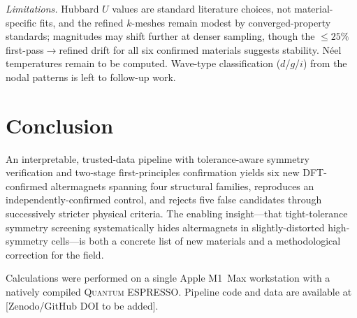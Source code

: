 \documentclass[aps,prmaterials,twocolumn,superscriptaddress,showkeys]{revtex4-2}
\begin{document}
\textit{Limitations.} Hubbard $U$ values are standard literature choices, not
material-specific fits, and the refined $k$-meshes remain modest by
converged-property standards; magnitudes may shift further at denser sampling,
though the $\leq 25\%$ first-pass$\to$refined drift for all six confirmed
materials suggests stability. N\'eel temperatures remain to be computed.
Wave-type classification ($d$/$g$/$i$) from the nodal patterns is left to
follow-up work.

\section{Conclusion}

An interpretable, trusted-data pipeline with tolerance-aware symmetry
verification and two-stage first-principles confirmation yields six new
DFT-confirmed altermagnets spanning four structural families, reproduces an
independently-confirmed control, and rejects five false candidates through
successively stricter physical criteria. The enabling insight---that
tight-tolerance symmetry screening systematically hides altermagnets in
slightly-distorted high-symmetry cells---is both a concrete list of new
materials and a methodological correction for the field.

\begin{acknowledgments}
Calculations were performed on a single Apple M1~Max workstation with a
natively compiled \textsc{Quantum ESPRESSO}. Pipeline code and data are
available at [Zenodo/GitHub DOI to be added].
\end{acknowledgments}
\end{document}
